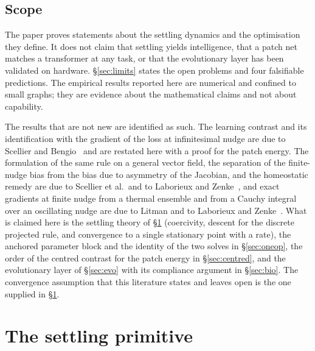 \documentclass[11pt]{article}
\theoremstyle{definition}
\theoremstyle{remark}
\begin{document}
\subsection{Scope}
The paper proves statements about the settling dynamics and the optimisation they define. It does not
claim that settling yields intelligence, that a patch net matches a transformer at any task, or that
the evolutionary layer has been validated on hardware. \S\ref{sec:limits} states the open problems and
four falsifiable predictions. The empirical results reported here are numerical and confined to small graphs; they are evidence
about the mathematical claims and not about capability.

The results that are not new are identified as such. The learning contrast and its identification with
the gradient of the loss at infinitesimal nudge are due to Scellier and
Bengio~\cite{scellier2017} and are restated here with a proof for the patch energy. The formulation of
the same rule on a general vector field, the separation of the finite-nudge bias from the bias due to
asymmetry of the Jacobian, and the homeostatic remedy are due to Scellier et al.\ and to Laborieux and
Zenke~\cite{scellier2018,laborieux2024}, and exact gradients at finite nudge from a thermal ensemble
and from a Cauchy integral over an oscillating nudge are due to Litman and to Laborieux and
Zenke~\cite{litman2025,laborieux2022}. What is claimed here is the settling theory of
\S\ref{sec:settling} (coercivity, descent for the discrete projected rule, and convergence to a single
stationary point with a rate), the anchored parameter block and the identity of the two solves in
\S\ref{sec:oneop}, the order of the centred contrast for the patch energy in
\S\ref{sec:centred}, and the evolutionary layer of \S\ref{sec:evo} with its compliance argument in
\S\ref{sec:bio}. The convergence assumption that this literature states and leaves open is the one
supplied in \S\ref{sec:settling}.

\section{The settling primitive}
\label{sec:settling}
\end{document}
